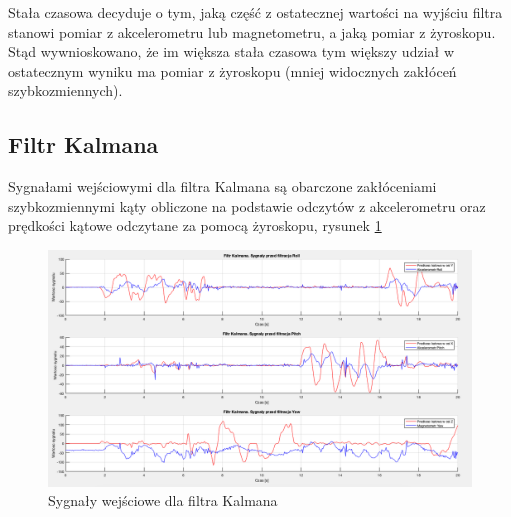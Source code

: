 Stała czasowa decyduje o tym, jaką część z ostatecznej wartości na wyjściu filtra stanowi pomiar z akcelerometru lub magnetometru, a jaką pomiar z żyroskopu. Stąd wywnioskowano, że im większa stała czasowa tym większy udział w ostatecznym wyniku ma pomiar z żyroskopu (mniej widocznych zakłóceń szybkozmiennych).
\subsection{Filtr Kalmana}

Sygnałami wejściowymi dla filtra Kalmana są obarczone zakłóceniami szybkozmiennymi kąty obliczone na podstawie odczytów z akcelerometru oraz prędkości kątowe odczytane za pomocą żyroskopu, rysunek \ref{Kalman przed}

\begin{figure}[h!]
    \centering
    \includegraphics[width=1\textwidth]{Rysunki/Rozdzial04/Filtr_Kalmana_przed.png}
    \caption{Sygnały wejściowe dla filtra Kalmana}
    \label{Kalman przed}
\end{figure}

